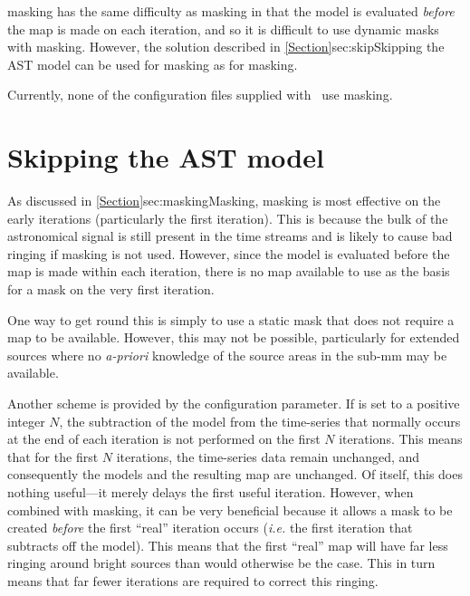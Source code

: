  masking has the same difficulty as  masking in that
the  model is evaluated \emph{before} the map is made on each
iteration, and so it is difficult to use dynamic masks with 
masking. However, the solution described in \cref{Section}{sec:skip}{Skipping
the AST model} can be used for  masking as for 
masking.

Currently, none of the configuration files supplied with \smurf\ use
 masking.

\section{Skipping the AST model}
\label{sec:skip}
As discussed in \cref{Section}{sec:masking}{Masking}, 
masking is most effective on the early iterations (particularly the
first iteration). This is because the bulk of the astronomical signal is
still present in the time streams and is likely to cause bad ringing if
 masking is not used. However, since the  model
is evaluated before the map is made within each iteration, there is no map
available to use as the basis for a  mask on the very first
iteration.

One way to get round this is simply to use a static mask that does not
require a map to be available. However, this may not be possible,
particularly for extended sources where no \emph{a-priori} knowledge of the
source areas in the sub-mm may be available.

Another scheme is provided by the 
configuration parameter. If  is set to a positive integer
$N$, the subtraction of the  model from the time-series that
normally occurs at the end of each iteration is not performed on the
first $N$ iterations. This means that for the first $N$ iterations, the
time-series data remain unchanged, and consequently the models and the
resulting map are unchanged. Of itself, this does nothing useful---it
merely delays the first useful iteration. However, when combined with
 masking, it can be very beneficial because it allows a mask
to be created \emph{before} the first ``real'' iteration occurs
(\emph{i.e.} the first iteration that subtracts off the 
model). This means that the first ``real'' map will have far less
ringing around bright sources than would otherwise be the case.  This in
turn means that far fewer iterations are required to correct this ringing.

